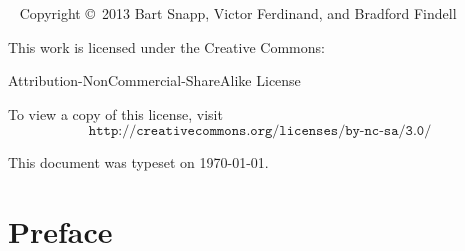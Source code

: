 

\newpage

\begin{fullwidth}
~\vfill
\thispagestyle{empty}
\setlength{\parindent}{0pt}
\setlength{\parskip}{\baselineskip}
Copyright \copyright~2013 Bart Snapp, Victor Ferdinand, and Bradford Findell

\vspace{.5cm}

\noindent
This work is licensed under the Creative Commons:
\begin{center}
Attribution-NonCommercial-ShareAlike License 
\end{center}
To view a copy of this license, visit
\[
\texttt{http://creativecommons.org/licenses/by-nc-sa/3.0/}
\]


\vspace{.5cm}
\noindent This document was typeset on \today.
\end{fullwidth}


\chapter*{Preface}


